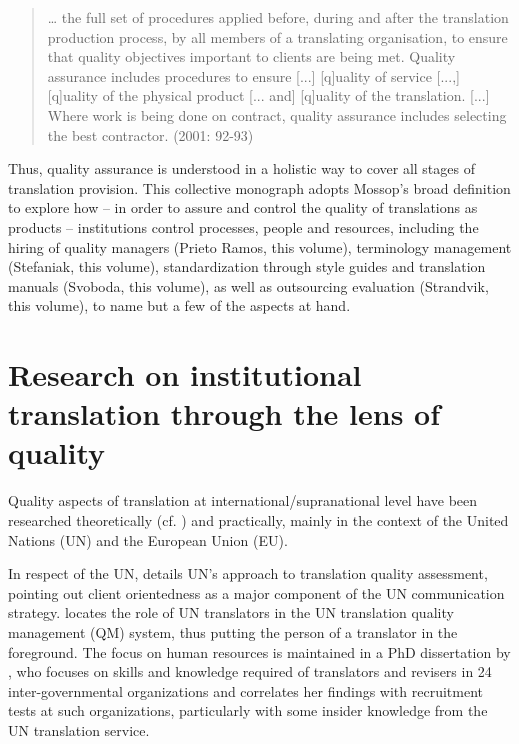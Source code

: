 \documentclass[output=paper]{langsci/langscibook}
\begin{document}
\begin{quote}
… the full set of procedures applied before, during and after the translation production process, by all members of a translating organisation, to ensure that quality objectives important to clients are being met. Quality assurance includes procedures to ensure [...] [q]uality of service [...,] [q]uality of the physical product [... and] [q]uality of the translation. [...] Where work is being done on contract, quality assurance includes selecting the best contractor. (2001: 92-93)
\end{quote}


Thus, quality assurance is understood in a holistic way to cover all stages of translation provision. This collective monograph adopts Mossop’s broad definition to explore how – in order to assure and control the quality of translations as products – institutions control processes, people and resources, including the hiring of quality managers (Prieto Ramos, this volume), terminology management (Stefaniak, this volume), standardization through style guides and translation manuals (Svoboda, this volume), as well as outsourcing evaluation (Strandvik, this volume), to name but a few of the aspects at hand. 

\section{Research on institutional translation through the lens of quality}

Quality aspects of translation at international/supranational level have been researched theoretically (cf. \citealt{PrietoRamos2015,PrietoRamos2015}) and practically, mainly in the context of the United Nations (UN) and the European Union (EU).

In respect of the UN,  \citet{DeSaintRobert2009} details UN’s approach to translation quality assessment, pointing out client orientedness as a major component of the UN communication strategy. \citet{Didaoui2009} locates the role of UN translators in the UN translation quality management (QM) system, thus putting the person of a translator in the foreground. The focus on human resources is maintained in a PhD dissertation by \citet{Lafeber2013}, who focuses on skills and knowledge required of translators and revisers in 24 inter-governmental organizations and correlates her findings with recruitment tests at such organizations, particularly with some insider knowledge from the UN translation service.
\end{document}
